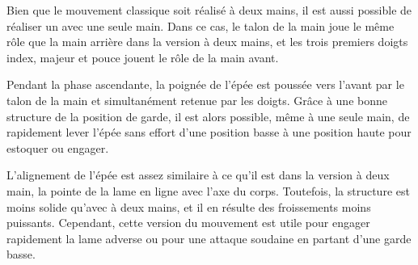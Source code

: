 Bien que le mouvement classique soit réalisé à deux mains, il est aussi possible de réaliser un \Duo{} avec une seule main. Dans ce cas, le talon de la main joue le même rôle que la main arrière dans la version à deux mains, et les trois premiers doigts \textemdash{} index, majeur et pouce \textemdash{} jouent le rôle de la main avant. 

Pendant la phase ascendante, la poignée de l'épée est poussée vers l'avant par le talon de la main et simultanément retenue par les doigts. Grâce à une bonne structure de la position de garde, il est alors possible, même à une seule main, de rapidement lever l'épée sans effort d'une position basse à une position haute pour estoquer ou engager.


L'alignement de l'épée est assez similaire à ce qu'il est dans la version à deux main, la pointe de la lame en ligne avec l'axe du corps. Toutefois, la structure est moins solide qu'avec \Duo{} à deux mains, et il en résulte des froissements moins puissants. Cependant, cette version du mouvement est utile pour engager rapidement la lame adverse ou pour une attaque soudaine en partant d'une garde basse.